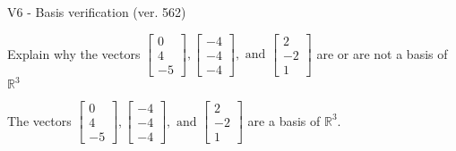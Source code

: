 \begin{exercise}
  \begin{exerciseTitle}V6 - Basis verification (ver. 562)\end{exerciseTitle}
  \begin{exerciseStatement}
    Explain why the vectors \(\left[\begin{array}{r}
0 \\
4 \\
-5
\end{array}\right] , \left[\begin{array}{r}
-4 \\
-4 \\
-4
\end{array}\right] , \text{ and } \left[\begin{array}{r}
2 \\
-2 \\
1
\end{array}\right]\) are or are not a basis of \(\mathbb{R}^3\)	


  \end{exerciseStatement}
  \begin{exerciseAnswer}
   The vectors \(\left[\begin{array}{r}
0 \\
4 \\
-5
\end{array}\right] , \left[\begin{array}{r}
-4 \\
-4 \\
-4
\end{array}\right] , \text{ and } \left[\begin{array}{r}
2 \\
-2 \\
1
\end{array}\right]\) 
  	 are  a basis of \(\mathbb{R}^3\).
  


  \end{exerciseAnswer}
\end{exercise}
